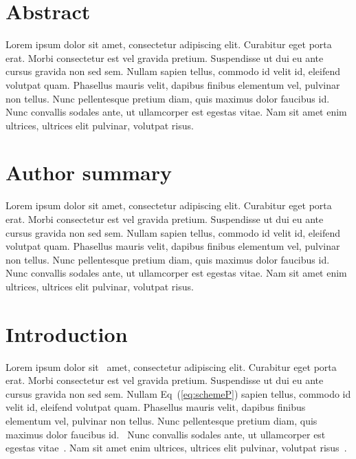 \documentclass[10pt,letterpaper]{article}
\begin{document}
\section*{Abstract}
Lorem ipsum dolor sit amet, consectetur adipiscing elit. Curabitur eget porta erat. Morbi consectetur est vel gravida pretium. Suspendisse ut dui eu ante cursus gravida non sed sem. Nullam sapien tellus, commodo id velit id, eleifend volutpat quam. Phasellus mauris velit, dapibus finibus elementum vel, pulvinar non tellus. Nunc pellentesque pretium diam, quis maximus dolor faucibus id. Nunc convallis sodales ante, ut ullamcorper est egestas vitae. Nam sit amet enim ultrices, ultrices elit pulvinar, volutpat risus.



%
\section*{Author summary}
Lorem ipsum dolor sit amet, consectetur adipiscing elit. Curabitur eget porta erat. Morbi consectetur est vel gravida pretium. Suspendisse ut dui eu ante cursus gravida non sed sem. Nullam sapien tellus, commodo id velit id, eleifend volutpat quam. Phasellus mauris velit, dapibus finibus elementum vel, pulvinar non tellus. Nunc pellentesque pretium diam, quis maximus dolor faucibus id. Nunc convallis sodales ante, ut ullamcorper est egestas vitae. Nam sit amet enim ultrices, ultrices elit pulvinar, volutpat risus.

\linenumbers

\section*{Introduction}
Lorem ipsum dolor sit~\cite{bib1} amet, consectetur adipiscing elit. Curabitur eget porta erat. Morbi consectetur est vel gravida pretium. Suspendisse ut dui eu ante cursus gravida non sed sem. Nullam Eq~(\ref{eq:schemeP}) sapien tellus, commodo id velit id, eleifend volutpat quam. Phasellus mauris velit, dapibus finibus elementum vel, pulvinar non tellus. Nunc pellentesque pretium diam, quis maximus dolor faucibus id.~\cite{bib2} Nunc convallis sodales ante, ut ullamcorper est egestas vitae~\cite{bib3}. Nam sit amet enim ultrices, ultrices elit pulvinar, volutpat risus~\cite{bib4}.
\end{document}
